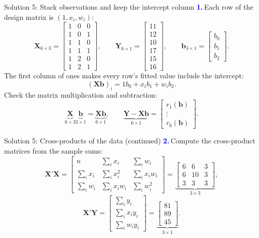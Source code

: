 \documentclass[notes,10pt, aspectratio=169]{beamer}
\newif\ifshowsolutions
\newcommand{\answerpart}[1]{\textcolor{blue}{\textbf{#1.}}\,}
\begin{document}
\ifshowsolutions
\begin{frame}{Solution 5: Stack observations and keep the intercept column}
\small
\answerpart{1}Each row of the design matrix is $(1,x_i,w_i)$:
\[
\mathbf X_{6\times3}=
\begin{bmatrix}
1&0&0\\
1&0&1\\
1&1&0\\
1&1&1\\
1&2&0\\
1&2&1
\end{bmatrix},
\qquad
\mathbf Y_{6\times1}=
\begin{bmatrix}11\\12\\10\\17\\15\\16\end{bmatrix},
\qquad
\mathbf b_{3\times1}=
\begin{bmatrix}b_0\\b_1\\b_2\end{bmatrix}.
\]
The first column of ones makes every row's fitted value include the intercept:
\[
(\mathbf X\mathbf b)_i=1b_0+x_ib_1+w_ib_2.
\]
Check the matrix multiplication and subtraction:
\[
\underbrace{\mathbf X}_{6\times3}
\underbrace{\mathbf b}_{3\times1}
=\underbrace{\mathbf X\mathbf b}_{6\times1},
\qquad
\underbrace{\mathbf Y-\mathbf X\mathbf b}_{6\times1}
=\begin{bmatrix}r_1(\mathbf b)\\\vdots\\r_6(\mathbf b)\end{bmatrix}.
\]
\end{frame}

\begin{frame}{Solution 5: Cross-products of the data (continued)}
\small
\answerpart{2}Compute the cross-product matrices from the sample sums:
\[
\mathbf X'\mathbf X
=\begin{bmatrix}
n&\sum_ix_i&\sum_iw_i\\
\sum_ix_i&\sum_ix_i^2&\sum_ix_iw_i\\
\sum_iw_i&\sum_ix_iw_i&\sum_iw_i^2
\end{bmatrix}
=\underbrace{\begin{bmatrix}6&6&3\\6&10&3\\3&3&3\end{bmatrix}}_{3\times3},
\]
\[
\mathbf X'\mathbf Y
=\begin{bmatrix}\sum_iy_i\\\sum_ix_iy_i\\\sum_iw_iy_i\end{bmatrix}
=\underbrace{\begin{bmatrix}81\\89\\45\end{bmatrix}}_{3\times1}.
\]
\end{frame}
\end{document}
